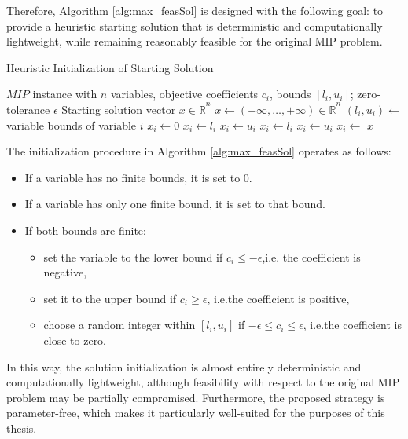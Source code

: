 Therefore, Algorithm \ref{alg:max_feasSol} is designed with the following goal: to provide a heuristic starting solution that is deterministic and computationally lightweight, while remaining reasonably feasible for the original MIP problem.  
\begin{algorithm}[H]
\caption{Heuristic Initialization of Starting Solution}\label{alg:max_feasSol}
\begin{algorithmic}[1]
\Require $MIP$ instance with $n$ variables, objective coefficients $c_i$, bounds $[l_i, u_i]$; zero-tolerance $\epsilon$
\Ensure Starting solution vector $x \in \bar{\mathbb{R}}^n$
    \State $x \gets ( +\infty, \ldots, +\infty ) \in \bar{\mathbb{R}}^n$
        \State $(l_i, u_i) \gets$ variable bounds of variable $i$
            \State $x_i \gets 0$
            \State $x_i \gets l_i$
            \State $x_i \gets u_i$
        \Else
                \State $x_i \gets l_i$
                \State $x_i \gets u_i$
            \Else
                \State $x_i \gets$ 
            \EndIf
        \EndIf
    \EndFor
    \State \Return $x$
\EndFunction
\end{algorithmic}
\end{algorithm}
The initialization procedure in Algorithm \ref{alg:max_feasSol} operates as follows:
\begin{itemize}
    \item If a variable has no finite bounds, it is set to $0$.
    \item If a variable has only one finite bound, it is set to that bound.
    \item If both bounds are finite:
    \begin{itemize}
        \item set the variable to the lower bound if $c_i \leq -\epsilon$,i.e. the coefficient is negative,
        \item set it to the upper bound if $c_i \geq \epsilon$, i.e.the coefficient is positive,
        \item choose a random integer within $[l_i, u_i]$ if $-\epsilon \leq c_i \leq \epsilon$, i.e.the coefficient is close to zero.
    \end{itemize}
\end{itemize}
In this way, the solution initialization is almost entirely deterministic and computationally lightweight, although feasibility with respect to the original MIP problem may be partially compromised. Furthermore, the proposed strategy is parameter-free, which makes it particularly well-suited for the purposes of this thesis.

